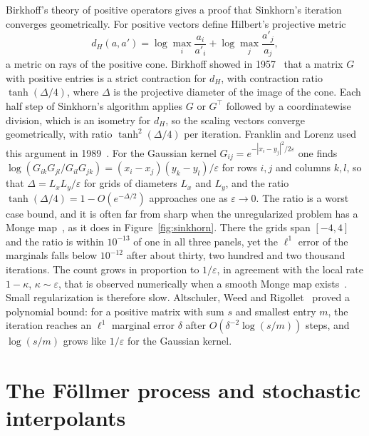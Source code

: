 Birkhoff's theory of positive operators gives a proof that Sinkhorn's iteration converges geometrically. For positive vectors define Hilbert's projective metric~\cite{hilbert1895}
\[
d_H(a,a') = \log\max_i\frac{a_i}{a'_i}+\log\max_j\frac{a'_j}{a_j},
\]
a metric on rays of the positive cone. Birkhoff showed in 1957~\cite{birkhoff1957} that a matrix $G$ with positive entries is a strict contraction for $d_H$, with contraction ratio $\tanh(\Delta/4)$, where $\Delta$ is the projective diameter of the image of the cone. Each half step of Sinkhorn's algorithm applies $G$ or $G^\top$ followed by a coordinatewise division, which is an isometry for $d_H$, so the scaling vectors converge geometrically, with ratio $\tanh^2(\Delta/4)$ per iteration. Franklin and Lorenz used this argument in 1989~\cite{franklinlorenz1989}. For the Gaussian kernel $G_{ij} = e^{-|x_i-y_j|^2/2\varepsilon}$ one finds $\log(G_{ik}G_{jl}/G_{il}G_{jk}) = (x_i-x_j)(y_k-y_l)/\varepsilon$ for rows $i,j$ and columns $k,l$, so that $\Delta = L_xL_y/\varepsilon$ for grids of diameters $L_x$ and $L_y$, and the ratio $\tanh(\Delta/4) = 1-O(e^{-\Delta/2})$ approaches one as $\varepsilon\to0$. The ratio is a worst case bound, and it is often far from sharp when the unregularized problem has a Monge map~\cite[Section~4.2]{peyrecuturi2019}, as it does in Figure~\ref{fig:sinkhorn}. There the grids span $[-4,4]$ and the ratio is within $10^{-13}$ of one in all three panels, yet the $\ell^1$ error of the marginals falls below $10^{-12}$ after about thirty, two hundred and two thousand iterations. The count grows in proportion to $1/\varepsilon$, in agreement with the local rate $1-\kappa$, $\kappa\sim\varepsilon$, that is observed numerically when a smooth Monge map exists~\cite[Section~4.2]{peyrecuturi2019}. Small regularization is therefore slow. Altschuler, Weed and Rigollet~\cite[Theorem~2]{altschuler2017} proved a polynomial bound: for a positive matrix with sum $s$ and smallest entry $m$, the iteration reaches an $\ell^1$ marginal error $\delta$ after $O(\delta^{-2}\log(s/m))$ steps, and $\log(s/m)$ grows like $1/\varepsilon$ for the Gaussian kernel.

\section{The F\"ollmer process and stochastic interpolants}

